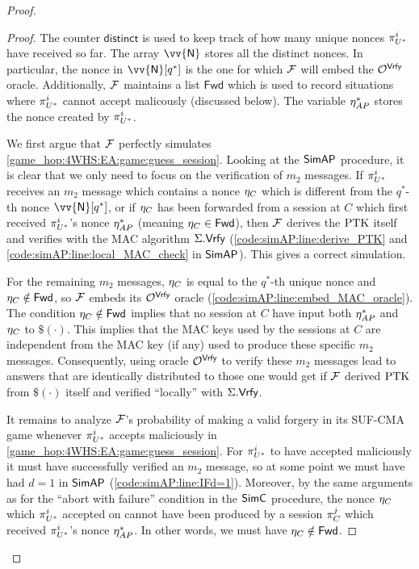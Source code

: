\begin{proof}
\begin{proof}
The counter $\mathsf{distinct}$ is used to keep track of how many unique nonces $\eatarget$ have received so far.
The array $\vv{\mathsf{N}}$ stores all the distinct nonces. 
In particular,
the nonce in $\vv{\mathsf{N}}[q^*]$ is the one for which $\A[F]$ will embed the $\mathcal{O}^{\macvrfy}$  oracle.
Additionally,
$\A[F]$ maintains a list $\mathsf{Fwd}$ which is used to record situations where $\eatarget$ cannot accept malicously
(discussed below).
The variable $\nonce_{AP}^*$ stores the nonce created by $\eatarget$.

We first argue that $\A[F]$ perfectly simulates \cref{game_hop:4WHS:EA:game:guess_session}.
Looking at the $\simAP$ procedure,
it is clear that we only need to focus on the verification of $m_2$ messages.
If $\eatarget$ receives an $m_2$ message which contains a nonce $\nonce_{C}$ which is different from the $q^*$-th nonce $\vv{\mathsf{N}}[q^*]$,
or if $\nonce_{C}$ has been forwarded from a session at $C$ which first received $\eatarget$'s nonce $\nonce_{AP}^*$
(meaning $\nonce_{C} \in  \mathsf{Fwd}$),
then $\A[F]$ derives the $\PTK$ itself and verifies with the MAC algorithm $\mac.\macvrfy$ 
(\cref{code:simAP:line:derive_PTK} and \cref{code:simAP:line:local_MAC_check} in $\simAP$).
This gives a correct simulation.


For the remaining $m_2$ messages,
$\nonce_{C}$ is equal to the $q^*$-th unique nonce and $\nonce_{C} \notin \mathsf{Fwd}$,
so $\A[F]$ embeds its $\mathcal{O}^{\macvrfy}$ oracle
(\cref{code:simAP:line:embed_MAC_oracle}).
The condition $\nonce_{C} \notin \mathsf{Fwd}$ implies that no session at $C$ have input both $\nonce_{AP}^*$ and $\nonce_{C}$ to $\$(\cdot)$.
This implies that the MAC keys used by the sessions at $C$ are independent from the MAC key
(if any) used to produce these specific $m_2$ messages.
Consequently,
using oracle $\mathcal{O}^{\macvrfy}$ to verify these $m_2$ messages lead to  answers that are identically distributed to those one would get if $\A[F]$ derived $\PTK$ from $\$(\cdot)$ itself and verified ``locally'' with $\mac.\macvrfy$.

It remains to analyze $\A[F]$'s probability of  making a valid forgery in its SUF-CMA game whenever $\eatarget$ accepts maliciously in \cref{game_hop:4WHS:EA:game:guess_session}.
For $\eatarget$ to have accepted maliciously it must have successfully verified an $m_2$ message,
so at some point we must have had $d = 1$ in $\simAP$
(\cref{code:simAP:line:IFd=1}).
Moreover,
by the same arguments as for the ``abort with failure'' condition in the $\simC$ procedure,
the nonce $\nonce_{C}$ which $\eatarget$ accepted on cannot have been produced by a session $\oracle[C][j]$ which received $\eatarget$'s nonce $\nonce_{AP}^*$.
In other words,
we must have $\nonce_{C} \notin \mathsf{Fwd}$.


\end{proof}
\end{proof}
